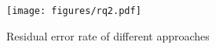 \begin{figure}[]
	\centering
 \texttt{[image: figures/rq2.pdf]}
	\caption{Residual error rate of different approaches}
	\label{fig:rq2}
\end{figure}
